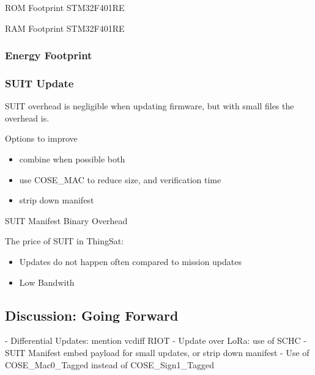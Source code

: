 \begin{table}[ht]
    \caption{ROM Footprint STM32F401RE}
    \label{tab:footprint-rom}
    \centering
    
\end{table}
\begin{table}[ht]
    \caption{RAM Footprint STM32F401RE}
    \label{tab:footprin-ram}
    \centering
    
\end{table}

\subsubsection{Energy Footprint} 

\subsubsection{SUIT Update}

SUIT overhead is negligible when updating firmware, but with small files the overhead
is.

Options to improve

\begin{itemize}
    \item combine when possible both
    \item use COSE\_MAC to reduce size, and verification time
    \item strip down manifest
\end{itemize}

\begin{figure}
    
\end{figure}

\begin{table}[ht]
    \caption{SUIT Manifest Binary Overhead}
    \label{tab:manifest-overhead}
    \centering
    
\end{table}

\begin{figure}
    
\end{figure}


The price of SUIT in ThingSat:

\begin{itemize}
    \item Updates do not happen often compared to mission updates
    \item Low Bandwith
\end{itemize}

\subsection{Discussion: Going Forward}
- Differential Updates: mention vcdiff RIOT
- Update over LoRa: use of SCHC
- SUIT Manifest embed payload for small updates, or strip down manifest
- Use of COSE\_Mac0\_Tagged instead of COSE\_Sign1\_Tagged
